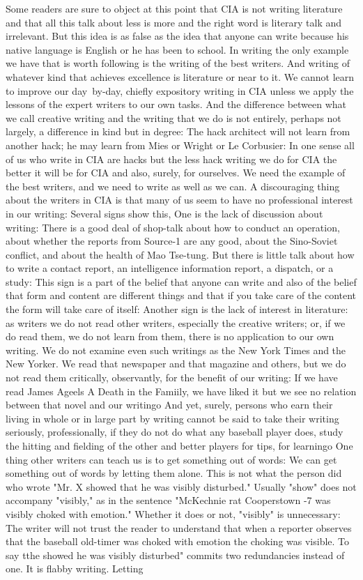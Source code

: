 \documentclass[
    oneside,
    11pt,
    draft
]{memoir}
\begin{document}
Some readers are sure to object at this point that CIA is not writing literature and that all this talk about less is more and the right word is literary talk and irrelevant. But this idea is as false as the idea that anyone can write because his native language is English or he has been to school. In writing the only example we have that is worth following is the writing of the best writers. And writing of whatever kind that achieves excellence is literature or near to it. We cannot learn to improve our day~by-day, chiefly expository writing in CIA unless we apply the lessons of the expert writers to our own tasks. And the difference between what we call creative writing and the writing that we do is not entirely, perhaps not largely, a difference in kind but in degree: The hack architect will not learn from another hack; he may learn from Mies or Wright or Le Corbusier: In one sense all of us who write in CIA are hacks but the less hack writing we do for CIA the better it will be for CIA and also, surely, for ourselves. We need the example of the best writers, and we need to write as well as we can. A discouraging thing about the writers in CIA is that many of us seem to have no professional interest in our writing: Several signs show this, One is the lack of discussion about writing: There is a good deal of shop-talk about how to conduct an operation, about whether the reports from Source-1 are any good, about the Sino-Soviet conflict, and about the health of Mao Tse-tung. But there is little talk about how to write a contact report, an intelligence information report, a dispatch, or a study: This sign is a part of the belief that anyone can write and also of the belief that form and content are different things and that if you take care of the content the form will take care of itself: Another sign is the lack of interest in literature: as writers we do not read other writers, especially the creative writers; or, if we do read them, we do not learn from them, there is no application to our own writing. We do not examine even such writings as the New York Times and the New Yorker. We read that newspaper and that magazine and others, but we do not read them critically, observantly, for the benefit of our writing: If we have read James Ageels A Death in the Famiily, we have liked it but we see no relation between that novel and our writingo And yet, surely, persons who earn their living in whole or in large part by writing cannot be said to take their writing seriously, professionally, if they do not do what any baseball player does, study the hitting and fielding of the other and better players for tips, for learningo One thing other writers can teach us is to get something out of words: We can get something out of words by letting them alone. This is not what the person did who wrote "Mr. X showed that he was visibly disturbed." Usually "show" does not accompany "visibly," as in the sentence "McKechnie rat Cooperstown -7 was visibly choked with emotion." Whether it does or not, "visibly" is unnecessary: The writer will not trust the reader to understand that when a reporter observes that the baseball old-timer was choked with emotion the choking was visible. To say tthe showed he was visibly disturbed" commits two redundancies instead of one. It is flabby writing. Letting 
\end{document}
